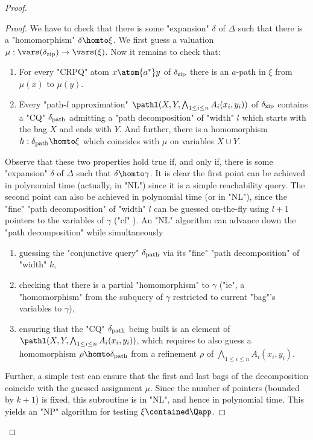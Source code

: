 \begin{proof}
\begin{proof}
        We have to check that there is some "expansion" $\delta$ of $\Delta$ such that there is a "homomorphism" $\delta \homto \xi$. 
        We first guess a valuation $\mu :  \vars(\delta_{\textup{zip}}) \to \vars(\xi)$.
        Now it remains to check that:
        \begin{enumerate}
          \item For every "CRPQ" atom $x \atom{a^*} y$ of $\delta_{\textup{zip}}$ there is an $a$-path in $\xi$ from $\mu(x)$ to $\mu(y)$.
          \item Every "path-$l$ approximation" $\pathl(X, Y, \bigwedge_{1 \leq i \leq n} A_i(x_i,y_i))$ of $\delta_{\textup{zip}}$ contains a "CQ" $\delta_{\textup{path}}$  admitting a "path decomposition" of "width" $l$ which starts with the bag $X$ and ends with $Y$. And further, there is a homomorphism $h: \delta_{\textup{path}}  \homto \xi$ which coincides with $\mu$ on variables $X \cup Y$.
        \end{enumerate}
        Observe that  these two properties hold true if, and only if, there is some "expansion" $\delta$ of $\Delta$ such that $\delta \homto \gamma$.
        It is clear the first point can be achieved in polynomial time (actually, in "NL") since it is a simple reachability query. 
        The second point can also be achieved in polynomial time (or in "NL"), since the "fine" "path decomposition" of "width" $l$ can be guessed on-the-fly using $l+1$ pointers to the variables of $\gamma$ ("cf" ). An "NL" algorithm can advance down the "path decomposition" while simultaneously
        \begin{enumerate}
          \item guessing the "conjunctive query" $\delta_{\textup{path}}$ via its "fine" "path decomposition" of "width" $k$,
          \item checking that there is a partial "homomorphism" to $\gamma$ ("ie", a "homomorphism" from the subquery of $\gamma$ restricted to current "bag"'s variables to $\gamma$),
          \item ensuring that the "CQ" $\delta_{\textup{path}}$ being built is an element of $\pathl(X, Y, \bigwedge_{1 \leq i \leq n} A_i(x_i,y_i))$, which requires to also guess a homomorphism $\rho \homto \delta_{\textup{path}}$ from a refinement $\rho$ of $\bigwedge_{1 \leq i \leq n} A_i(x_i,y_i)$.
        \end{enumerate}
        Further, a simple test can ensure that the first and last bags of the decomposition  coincide with the guessed assignment $\mu$.
        Since the number of pointers (bounded by $k+1$) is fixed, this subroutine is in "NL", and hence in polynomial time. This yields an "NP" algorithm for testing $\xi \contained \Qapp$.
  \end{proof}



\end{proof}
